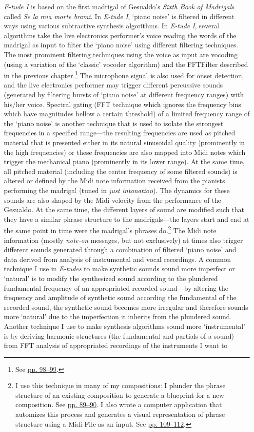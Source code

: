 \emph{E-tude I} is based on the first madrigal of Gesualdo's \emph{Sixth Book of Madrigals} called \emph{Se la mia morte brami}. In \emph{E-tude I}, `piano noise' is filtered in different ways using various subtractive synthesis algorithms. In \emph{E-tude I}, several algorithms take the live electronics performer's voice reading the words of the madrigal as input to filter the `piano noise' using different filtering techniques. The most prominent filtering techniques using the voice as input are vocoding (using a variation of the `classic' vocoder algorithm) and the FFTFilter described in the previous chapter.\footnote{See \hyperlink{fftfilter}{pp. 98--99}.} The microphone signal is also used for onset detection, and the live electronics performer may trigger different percussive sounds (generated by filtering bursts of `piano noise' at different frequency ranges) with his/her voice.  Spectral gating (FFT technique which ignores the frequency bins which have magnitudes bellow a certain threshold) of a limited frequency range of the `piano noise' is another technique that is used to isolate the strongest frequencies in a specified range---the resulting frequencies are used as pitched material that is presented either in its natural sinusoidal quality (prominently in the high frequencies) or these frequencies are also mapped into Midi notes which trigger the mechanical piano (prominently in its lower range). At the same time, all pitched material (including the center frequency of some filtered sounds) is altered or defined by the Midi note information received from the pianists performing the madrigal (tuned in \emph{just intonation}). The dynamics for these sounds are also shaped by the Midi velocity from the performance of the Gesualdo. At the same time, the different layers of sound are modified such that they have a similar phrase structure to the madrigals---the layers start and end at the same point in time were the madrigal's phrases do.\footnote{I use this technique in many of my compositions: I plunder the phrase structure of an existing composition to generate a blueprint for a new composition. See \hyperlink{macroplunder}{pp. 89--90}. I also wrote a computer application that automizes this process and generates a visual representation of phrase structure using a Midi File as an input. See \hyperlink{scorevisual}{pp. 109--112}.} The Midi note information (mostly \emph{note-on} messages, but not exclusively) at times also trigger different sounds generated through a combination of filtered `piano noise' and data derived from analysis of instrumental and vocal recordings. A common technique I use in \emph{E-tudes} to make synthetic sounds sound more imperfect or `natural' is to modify the synthesized sound according to the plundered fundamental frequency of an appropriated recorded sound---by altering the frequency and amplitude of synthetic sound according the fundamental of the recorded sound, the synthetic sound becomes more irregular and therefore sounds more `natural' due to the imperfection it inherits from the plundered sound. Another technique I use to make synthesis algorithms sound more `instrumental' is by deriving harmonic structures (the fundamental and partials of a sound) from FFT analysis of appropriated recordings of the instruments I want to 